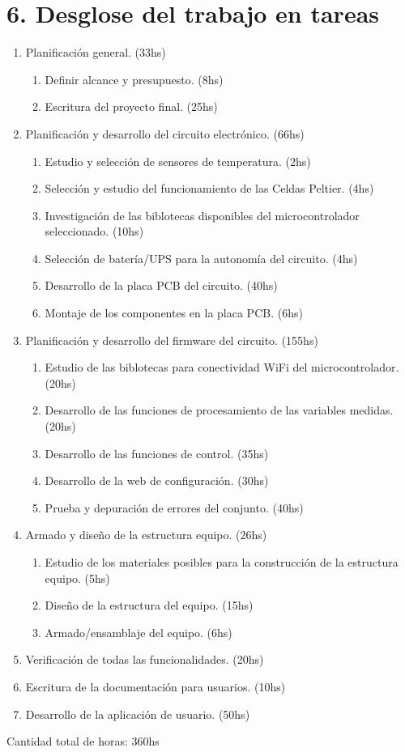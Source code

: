 \section{6. Desglose del trabajo en tareas}
\label{sec:wbs}


\begin{enumerate}
  \item Planificación general. (33hs)
  \begin{enumerate}
  	  \item Definir alcance y presupuesto. (8hs)
      \item Escritura del proyecto final. (25hs) 
  \end{enumerate}
  \item Planificación y desarrollo del circuito electrónico. (66hs)
  \begin{enumerate}
  	  \item Estudio y selección de sensores de temperatura. (2hs)
      \item Selección y estudio del funcionamiento de las Celdas Peltier. (4hs)
      \item Investigación de las biblotecas disponibles del microcontrolador seleccionado. (10hs)
      \item Selección de batería/UPS para la autonomía del circuito. (4hs)
      \item Desarrollo de la placa PCB del circuito. (40hs)
      \item Montaje de los componentes en la placa PCB. (6hs)
  \end{enumerate}
  \item Planificación y desarrollo del firmware del circuito. (155hs)
  \begin{enumerate}
  	  \item Estudio de las biblotecas para conectividad WiFi del microcontrolador. (20hs)
      \item Desarrollo de las funciones de procesamiento de las variables medidas. (20hs)
      \item Desarrollo de las funciones de control. (35hs)
      \item Desarrollo de la web de configuración. (30hs)
      \item Prueba y depuración de errores del conjunto. (40hs)
  \end{enumerate}
  \item Armado y diseño de la estructura equipo. (26hs)
  \begin{enumerate}
    \item Estudio de los materiales posibles para la construcción de la estructura equipo. (5hs)
    \item Diseño de la estructura del equipo. (15hs)
    \item Armado/ensamblaje del equipo. (6hs)
  \end{enumerate}
  \item Verificación de todas las funcionalidades. (20hs)
  \item Escritura de la documentación para usuarios. (10hs)
  \item Desarrollo de la aplicación de usuario. (50hs)
\end{enumerate}

Cantidad total de horas: 360hs